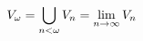 \documentclass[preview]{standalone}
\begin{document}
\begin{align*}
\special{dvisvgm:raw <g id='unique000'>}V_\omega  = \bigcup_{n<\omega} V_n = \lim_{n\rightarrow \infty} V_n\special{dvisvgm:raw </g>}
\end{align*}
\end{document}
